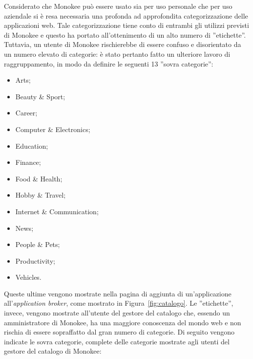 Considerato che Monokee può essere usato sia per uso personale che per uso aziendale si è resa necessaria una profonda ad approfondita categorizzazione delle applicazioni web. Tale categorizzazione tiene conto di entrambi gli utilizzi previsti di Monokee e questo ha portato all'ottenimento di un alto numero di ''etichette''. Tuttavia, un utente di Monokee rischierebbe di essere confuso e disorientato da un numero elevato di categorie: è stato pertanto fatto un ulteriore lavoro di raggruppamento, in modo da definire le seguenti 13 ''sovra categorie'':
\begin{itemize}
\item Arts;
\item Beauty \& Sport;
\item Career;
\item Computer \& Electronics;
\item Education;
\item Finance;
\item Food \& Health;
\item Hobby \& Travel;
\item Internet \& Communication;
\item News;
\item People \& Pets;
\item Productivity;
\item Vehicles.
\end{itemize}
Queste ultime vengono mostrate nella pagina di aggiunta di un'applicazione all'\textit{application broker}, come mostrato in Figura~\ref{fig:catalogo}. Le ''etichette'', invece, vengono mostrate all'utente del gestore del catalogo che, essendo un amministratore di Monokee, ha una maggiore conoscenza del mondo web e non rischia di essere sopraffatto dal gran numero di categorie. Di seguito vengono indicate le sovra categorie, complete delle categorie mostrate agli utenti del gestore del catalogo di Monokee:
